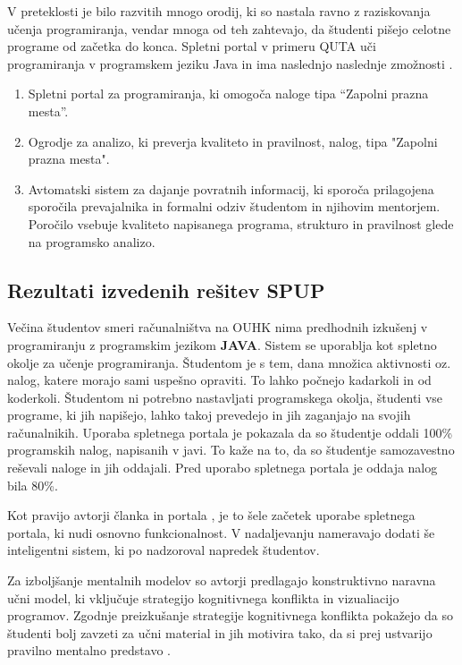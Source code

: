 V preteklosti je bilo razvitih mnogo orodij, ki so nastala ravno z
raziskovanja učenja programiranja, vendar mnoga od teh zahtevajo, da
študenti pišejo celotne programe od začetka do konca. Spletni portal
v primeru QUTA uči programiranja v programskem jeziku Java in ima
naslednjo naslednje zmožnosti \cite{thesisAWebP}.

\begin{enumerate}
\tightlist
\item Spletni portal za programiranja, ki omogoča naloge tipa ``Zapolni
   prazna mesta''.
 \item Ogrodje za analizo, ki preverja kvaliteto in pravilnost, nalog,
   tipa "Zapolni prazna mesta".
 \item  Avtomatski sistem za dajanje povratnih informacij, ki sporoča
   prilagojena sporočila prevajalnika in formalni odziv študentom in
   njihovim mentorjem. Poročilo vsebuje kvaliteto napisanega programa,
   strukturo in pravilnost glede na programsko analizo.
\end{enumerate}

\subsection{Rezultati izvedenih rešitev SPUP}
\label{sec:rezultati_izvedenih_rešitev}

Večina študentov smeri računalništva na OUHK nima predhodnih izkušenj
v programiranju z programskim jezikom \textbf{JAVA}. Sistem se
uporablja kot spletno okolje za učenje programiranja. Študentom je s
tem, dana množica aktivnosti oz. nalog, katere morajo sami uspešno
opraviti. To lahko počnejo kadarkoli in od koderkoli. Študentom ni
potrebno nastavljati programskega okolja, študenti vse programe, ki
jih napišejo, lahko takoj prevedejo in jih zaganjajo na svojih
računalnikih. Uporaba spletnega portala je pokazala da so študentje
oddali 100\% programskih nalog, napisanih v javi. To kaže na to, da so
študentje samozavestno reševali naloge in jih oddajali. Pred uporabo
spletnega portala je oddaja nalog bila 80\%.

Kot pravijo avtorji članka in portala \cite{ITaLCP_DistanceEdu}, je to
šele začetek uporabe spletnega portala, ki nudi osnovno
funkcionalnost. V nadaljevanju nameravajo dodati še inteligentni
sistem, ki po nadzoroval napredek študentov.

Za izboljšanje mentalnih modelov so avtorji predlagajo konstruktivno
naravna učni model, ki vključuje strategijo kognitivnega konflikta in
vizualiacijo programov. Zgodnje preizkušanje strategije kognitivnega
konflikta pokažejo da so študenti bolj zavzeti za učni material in jih
motivira tako, da si prej ustvarijo pravilno mentalno predstavo
\cite{mentalModels}.

